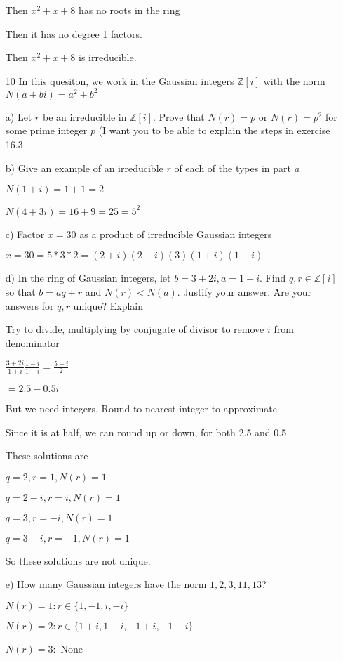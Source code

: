 \documentclass[12pt]{article}
\begin{document}
\begin{itemize}
		Then $x^2 + x + 8$ has no roots in the ring

		Then it has no degree 1 factors.

		Then $x^2 + x + 8$ is irreducible.

	\item[10] In this quesiton, we work in the Gaussian integers $\mathbb{Z}[i]$  with the norm $N(a+bi) = a^2 + b^2$

		a) Let $r$ be an irreducible in $\mathbb{Z}[i]$. Prove that $N(r) = p$ or $N(r) = p^2$ for some prime integer $p$ (I want you to be able to explain the steps in exercise 16.3

		b) Give an example of an irreducible $r$ of each of the types in part $a$

		$N(1+i) = 1 + 1 = 2$

		$N(4 + 3i) = 16 + 9 = 25 = 5^2$

		c) Factor $x = 30$ as a product of irreducible Gaussian integers

		$x = 30 = 5 * 3 * 2 = (2 + i)(2-i)(3)(1+i)(1-i)$

		d) In the ring of Gaussian integers, let $b = 3 + 2i, a = 1+ i$. Find $q,r \in \mathbb{Z}[i]$ so that $b = aq + r$ and $N(r) < N(a)$. Justify your answer. Are your answers for $q,r$ unique? Explain

		Try to divide, multiplying by conjugate of divisor to remove $i$ from denominator

		$\frac{3+2i}{1+i} \frac{1-i}{1-i} = \frac{5-i}{2}$

		$ = 2.5 - 0.5i$

		But we need integers. Round to nearest integer to approximate

		Since it is at half, we can round up or down, for both 2.5 and 0.5

		These solutions are 
		
		$q = 2, r = 1, N(r) = 1$
		
		$q = 2 -i, r = i, N(r) = 1$
		
		$q = 3, r = -i, N(r) = 1$
		
		$q= 3- i, r = -1, N(r) = 1$
	
		So these solutions are not unique.

		e) How many Gaussian integers have the norm $1,2,3,11,13$?

		$N(r) = 1: r \in \{1, -1, i, -i\}$

		$N(r) = 2: r \in \{1+i, 1-i, -1+i, -1 - i\}$

		$N(r) = 3:$ None


\end{itemize}
\end{document}

